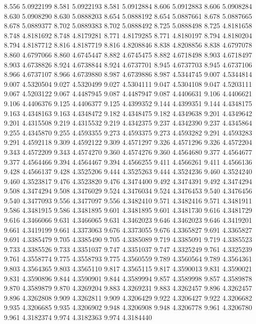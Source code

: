 8.556 5.0922199
8.581 5.0922193
8.581 5.0912884
8.606 5.0912883
8.606 5.0908284
8.630 5.0908290
8.630 5.0888203
8.654 5.0888192
8.654 5.0887661
8.678 5.0887665
8.678 5.0889377
8.702 5.0889383
8.702 5.0888492
8.725 5.0888498
8.725 4.8181658
8.748 4.8181692
8.748 4.8179281
8.771 4.8179285
8.771 4.8180197
8.794 4.8180204
8.794 4.8187712
8.816 4.8187719
8.816 4.8208846
8.838 4.8208856
8.838 4.6797078
8.860 4.6797066
8.860 4.6745447
8.882 4.6745475
8.882 4.6718498
8.903 4.6718497
8.903 4.6738826
8.924 4.6738844
8.924 4.6737701
8.945 4.6737703
8.945 4.6737106
8.966 4.6737107
8.966 4.6739880
8.987 4.6739886
8.987 4.5344745
9.007 4.5344814
9.007 4.5320504
9.027 4.5320499
9.027 4.5304111
9.047 4.5304108
9.047 4.5203111
9.067 4.5203122
9.067 4.4487945
9.087 4.4487947
9.087 4.4406631
9.106 4.4406621
9.106 4.4406376
9.125 4.4406377
9.125 4.4399352
9.144 4.4399351
9.144 4.4348175
9.163 4.4348163
9.163 4.4348472
9.182 4.4348475
9.182 4.4349638
9.201 4.4349642
9.201 4.4315508
9.219 4.4315532
9.219 4.4342375
9.237 4.4342390
9.237 4.4345864
9.255 4.4345870
9.255 4.4593355
9.273 4.4593375
9.273 4.4593282
9.291 4.4593283
9.291 4.4592118
9.309 4.4592122
9.309 4.4571297
9.326 4.4571296
9.326 4.4572204
9.343 4.4572209
9.343 4.4574270
9.360 4.4574276
9.360 4.4564680
9.377 4.4564677
9.377 4.4564466
9.394 4.4564467
9.394 4.4566255
9.411 4.4566261
9.411 4.4566136
9.428 4.4566137
9.428 4.3525206
9.444 4.3525263
9.444 4.3524236
9.460 4.3524240
9.460 4.3523817
9.476 4.3523820
9.476 4.3474400
9.492 4.3474391
9.492 4.3474294
9.508 4.3474294
9.508 4.3476029
9.524 4.3476034
9.524 4.3476453
9.540 4.3476456
9.540 4.3477093
9.556 4.3477097
9.556 4.3482410
9.571 4.3482416
9.571 4.3481911
9.586 4.3481915
9.586 4.3481895
9.601 4.3481895
9.601 4.3481730
9.616 4.3481729
9.616 4.3466066
9.631 4.3466065
9.631 4.3462023
9.646 4.3462023
9.646 4.3419201
9.661 4.3419199
9.661 4.3373063
9.676 4.3373055
9.676 4.3365827
9.691 4.3365827
9.691 4.3385479
9.705 4.3385490
9.705 4.3385089
9.719 4.3385091
9.719 4.3385523
9.733 4.3385526
9.733 4.3351037
9.747 4.3351037
9.747 4.3325249
9.761 4.3325239
9.761 4.3558774
9.775 4.3558793
9.775 4.3560559
9.789 4.3560564
9.789 4.3564361
9.803 4.3564365
9.803 4.3565110
9.817 4.3565115
9.817 4.3590013
9.831 4.3590021
9.831 4.3590896
9.844 4.3590901
9.844 4.3589994
9.857 4.3589998
9.857 4.3589878
9.870 4.3589879
9.870 4.3269204
9.883 4.3269231
9.883 4.3262457
9.896 4.3262457
9.896 4.3262808
9.909 4.3262811
9.909 4.3206429
9.922 4.3206427
9.922 4.3206682
9.935 4.3206685
9.935 4.3206902
9.948 4.3206908
9.948 4.3206778
9.961 4.3206780
9.961 4.3182374
9.974 4.3182363
9.974 4.3184440
